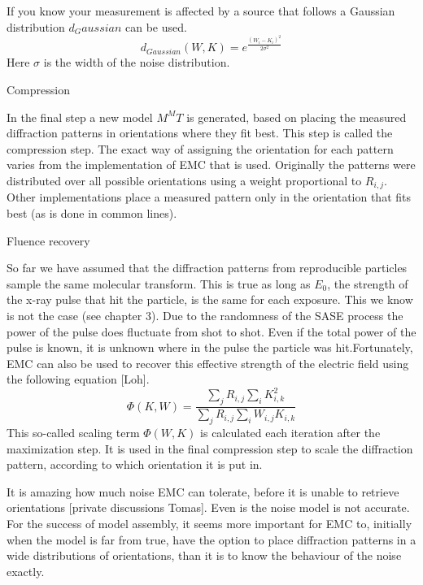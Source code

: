 If you know your measurement is affected by a source that follows a Gaussian distribution $d_Gaussian$ can be used.
\begin{equation}
d_{Gaussian}(W,K) = e^{\frac{(W_i-K_i)^2}{2\sigma^2}}
\end{equation}
Here $\sigma$ is the width of the noise distribution. 

Compression

In the final step a new model $M^MT$ is generated, based on placing the measured diffraction patterns in orientations where they fit best. This step is called the compression step. The exact way of assigning the orientation for each pattern varies from the implementation of EMC that is used. Originally the patterns were distributed over all possible orientations using a weight proportional to $R_{i,j}$. Other implementations place a measured pattern only in the orientation that fits best (as is done in common lines).

Fluence recovery

So far we have assumed that the diffraction patterns from reproducible particles sample the same molecular transform. This is true as long as $E_0$, the strength of the x-ray pulse that hit the particle, is the same for each exposure. This we know is not the case (see chapter 3). Due to the randomness of the SASE process the power of the pulse does fluctuate from shot to shot. Even if the total power of the pulse is known, it is unknown where in the pulse the particle was hit.Fortunately, EMC can also be used to recover this effective strength of the electric field using the following equation [Loh].
\begin{equation}
\Phi(K,W) = \frac{\sum_{j} R_{i,j} \sum_{i} K_{i,k}^2 }{\sum_{j} R_{i,j} \sum_{i} W_{i,j} K_{i,k}}
\end{equation}
This so-called scaling term $\Phi(W,K)$ is calculated each iteration after the maximization step. It is used in the final compression step to scale the diffraction pattern, according to which orientation it is put in.




It is amazing how much noise EMC can tolerate, before it is unable to retrieve orientations [private discussions Tomas]. Even is the noise model is not accurate. For the success of model assembly, it seems more important for EMC to, initially when the model is far from true, have the option to place diffraction patterns in a wide distributions of orientations, than it is to know the behaviour of the noise exactly.


